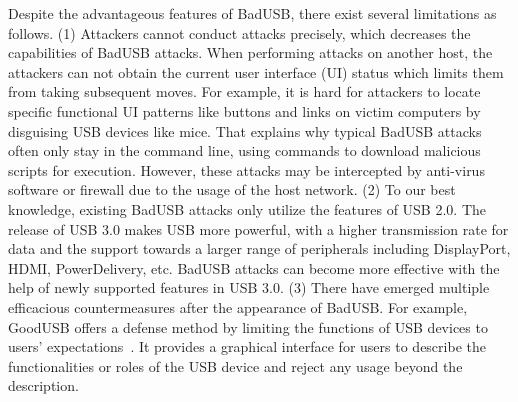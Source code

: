 Despite the advantageous features of BadUSB, there exist several limitations as
follows.  (1) Attackers cannot conduct attacks precisely, which decreases the
capabilities of BadUSB attacks.  When performing attacks on another host, the
attackers can not obtain the current user interface (UI) status which limits
them from taking subsequent moves.  For example, it is hard for attackers to
locate specific functional UI patterns like buttons and links on victim
computers by disguising USB devices like mice.  That explains why typical
BadUSB attacks often only stay in the command line, using commands to download
malicious scripts for execution.  However, these attacks may be intercepted by
anti-virus software or firewall due to the usage of the host network.  (2) To
our best knowledge, existing BadUSB attacks only utilize the features of USB
2.0.  The release of USB 3.0 makes USB more powerful, with a higher
transmission rate for data and the support towards a larger range of
peripherals including DisplayPort, HDMI, PowerDelivery, etc.  BadUSB attacks
can become more effective with the help of newly supported features in USB 3.0.
(3) There have emerged multiple efficacious countermeasures after the
appearance of BadUSB.  For example, GoodUSB offers a defense method by limiting
the functions of USB devices to users' expectations~\cite{tian2015defending}.
It provides a graphical interface for users to describe the functionalities or
roles of the USB device and reject any usage beyond the description.

